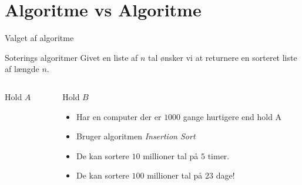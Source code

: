 \documentclass[12pt,t]{beamer}
\begin{document}
\section{Algoritme vs Algoritme}
    \begin{frame}[t]{Valget af algoritme}
        \begin{exampleblock}{Soterings algoritmer}
            Givet en liste af $n$ tal ønsker vi at returnere en sorteret liste
            af længde $n$.
        \end{exampleblock}
        \pause{}
        \vspace{-2em}
        \begin{columns}
            \begin{column}{0.5\textwidth}
                \begin{block}{Hold $A$}
                    \begin{itemize}
                    \end{itemize}
                \end{block}
            \end{column}
            \begin{column}{0.5\textwidth}
                \begin{block}{Hold $B$}
                    \begin{itemize}[<+->]
                    \item Har en computer der er $1000$ gange hurtigere end
                    hold A
                    \item Bruger algoritmen \emph{Insertion Sort}
                    \item De kan sortere $10$ millioner tal på $5$ timer.
                    \item De kan sortere $100$ millioner tal på \alert{23 dage!}
                    \end{itemize}
                \end{block}
            \end{column}
        \end{columns}
    \end{frame}
\end{document}
